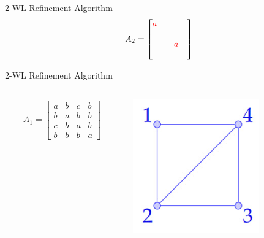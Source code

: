 \documentclass{beamer}
\begin{document}
\begin{frame}{2-WL Refinement Algorithm}
    \vspace{1em}
    \begin{align*}
        A_2 = \begin{bmatrix}
            \textcolor{red}{a}& & & \\
             & & & \\
             & &\textcolor{red}{a}& \\
             & & & \\
        \end{bmatrix}
    \end{align*}
\end{frame}
\addtocounter{framenumber}{-1}
\begin{frame}{2-WL Refinement Algorithm}
    \begin{columns}
        \begin{column}{0.7\textwidth}
        \begin{align*}
            A_1 = \begin{bmatrix}
                a&b&c&b\\
                b&a&b&b\\
                c&b&a&b\\
                b&b&b&a
            \end{bmatrix}
        \end{align*}
        \end{column}

        \begin{column}{0.3\textwidth}
            \centering
            \includegraphics[width=0.7\textwidth]{slides/pic_1.jpg}
        \end{column}
    \end{columns}
    

\end{frame}
\end{document}
